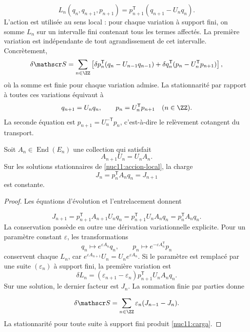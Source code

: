 \[
 L_n(q_n,q_{n+1},p_{n+1})
 =p_{n+1}^{\mathsf T}(q_{n+1}-U_nq_n).
\]
L’action est utilisée au sens local :
pour chaque variation à support fini, on somme \(L_n\) sur un
intervalle fini contenant tous les termes affectés.
La première variation est indépendante de tout agrandissement
de cet intervalle. Concrètement,
\begin{equation}
 \delta\mathscr S
 =\sum_{n\in\ZZ}
 \left[
  \delta p_n^{\mathsf T}(q_n-U_{n-1}q_{n-1})
  +\delta q_n^{\mathsf T}(p_n-U_n^{\mathsf T}p_{n+1})
 \right],
 \label{nuc11:accion-local}
\end{equation}
où la somme est finie pour chaque variation admise.
La stationnarité par rapport à toutes ces variations équivaut à
\[
 q_{n+1}=U_nq_n,\qquad
 p_n=U_n^{\mathsf T}p_{n+1}
 \quad(n\in\ZZ).
\]
La seconde équation est
\(p_{n+1}=U_n^{-\mathsf T}p_n\), c’est-à-dire le relèvement
cotangent du transport.


\begin{proposition}
\label{nuc11:noether}
Soit \(A_n\in\operatorname{End}(E_n)\) une collection qui satisfait
\[
 A_{n+1}U_n=U_nA_n.
\]
Sur les solutions stationnaires de
\eqref{nuc11:accion-local}, la charge
\begin{equation}
 \boxed{J_n=p_n^{\mathsf T}A_nq_n=J_{n+1}}
 \label{nuc11:carga}
\end{equation}
est constante.
\end{proposition}
\begin{proof}
Les équations d’évolution et l’entrelacement donnent

\[
 J_{n+1}
 =p_{n+1}^{\mathsf T}A_{n+1}U_nq_n
 =p_{n+1}^{\mathsf T}U_nA_nq_n
 =p_n^{\mathsf T}A_nq_n.
\]
La conservation possède en outre une dérivation variationnelle explicite.
Pour un paramètre constant \(\varepsilon\), les transformations
\[
 q_n\mapsto e^{\varepsilon A_n}q_n,\qquad
 p_n\mapsto e^{-\varepsilon A_n^{\mathsf T}}p_n
\]
conservent chaque \(L_n\), car
\(e^{\varepsilon A_{n+1}}U_n=U_ne^{\varepsilon A_n}\).
Si le paramètre est remplacé par une suite
\((\varepsilon_n)\) à support fini, la première variation est
\[
 \delta L_n
 =(\varepsilon_{n+1}-\varepsilon_n)
   p_{n+1}^{\mathsf T}U_nA_nq_n.
\]
Sur une solution, le dernier facteur est \(J_n\).
La sommation finie par parties donne

\[
 \delta\mathscr S
 =\sum_{n\in\ZZ}\varepsilon_n(J_{n-1}-J_n).
\]
La stationnarité pour toute suite à support fini produit
\eqref{nuc11:carga}.
\end{proof}

